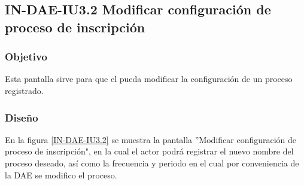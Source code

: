 \subsection{IN-DAE-IU3.2 Modificar configuración de proceso de inscripción}

\subsubsection{Objetivo}
	
	Esta pantalla sirve para que el  pueda modificar la configuración de un proceso registrado.

\subsubsection{Diseño}

    En la figura \ref{IN-DAE-IU3.2} se muestra la pantalla ''Modificar configuración de proceso de inscripción", en la cual el actor podrá registrar el nuevo nombre del proceso deseado, así como la frecuencia y periodo en el cual por conveniencia de la DAE se modifico el proceso.
            
